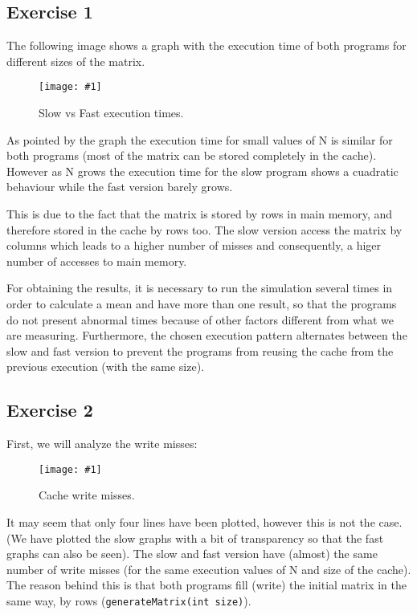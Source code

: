 \documentclass{article}
\newcommand{\myFigure}[4]{%
    \begin{figure}[!ht]
        \texttt{[image: \#1]}
        \centering
        \caption{#2}
        \label{#3}
    \end{figure}
}
\begin{document}
\pagebreak

\subsection*{Exercise 1}

The following image shows a graph with the execution time of both programs for different sizes of the matrix.

\myFigure{../material_P3/out1/mv_att4/slow_fast_time.png}{Slow vs Fast execution times.}{slow_fast_times}{0.45}

As pointed by the graph the execution time for small values of N is similar for both programs (most of the matrix can be stored completely in the cache). However as N grows the execution time for the slow program shows a cuadratic behaviour while the fast version barely grows.

This is due to the fact that the matrix is stored by rows in main memory, and therefore stored in the cache by rows too. The slow version access the matrix by columns which leads to a higher number of misses and consequently, a higer number of accesses to main memory. 

For obtaining the results, it is necessary to run the simulation several times in order to calculate a mean and have more than one result, so that the programs do not present abnormal times because of other factors different from what we are measuring. Furthermore, the chosen execution pattern alternates between the slow and fast version to prevent the programs from reusing the cache from the previous execution (with the same size).


\subsection*{Exercise 2}

First, we will analyze the write misses: 

\myFigure{../material_P3/out2/mv_att1/cache_escritura.png}{Cache write misses.}{cache_escritura}{0.4}

It may seem that only four lines have been plotted, however this is not the case. (We have plotted the slow graphs with a bit of transparency so that the fast graphs can also be seen). The slow and fast version have (almost) the same number of write misses (for the same execution values of N and size of the cache). The reason behind this is that both programs fill (write) the initial matrix in the same way, by rows (\texttt{generateMatrix(int size)}).
\end{document}
